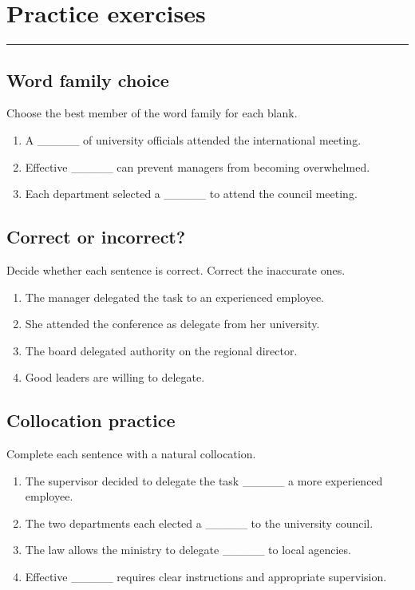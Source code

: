 \documentclass[11pt]{article}
\newcommand{\sectionrule}{\par\vspace{-0.5em}\noindent\textcolor{Accent}{\rule{\linewidth}{0.6pt}}\par}
\begin{document}
\section{Practice exercises}
\sectionrule
\subsection{Word family choice}
Choose the best member of the word family for each blank.

\begin{enumerate}
  \item A \_\_\_\_\_ of university officials attended the international meeting.
  \item Effective \_\_\_\_\_ can prevent managers from becoming overwhelmed.
  \item Each department selected a \_\_\_\_\_ to attend the council meeting.
\end{enumerate}

\subsection{Correct or incorrect?}
Decide whether each sentence is correct. Correct the inaccurate ones.

\begin{enumerate}
  \item The manager delegated the task to an experienced employee.
  \item She attended the conference as delegate from her university.
  \item The board delegated authority on the regional director.
  \item Good leaders are willing to delegate.
\end{enumerate}

\subsection{Collocation practice}
Complete each sentence with a natural collocation.

\begin{enumerate}
  \item The supervisor decided to delegate the task \_\_\_\_\_ a more experienced employee.
  \item The two departments each elected a \_\_\_\_\_ to the university council.
  \item The law allows the ministry to delegate \_\_\_\_\_ to local agencies.
  \item Effective \_\_\_\_\_ requires clear instructions and appropriate supervision.
\end{enumerate}
\end{document}
